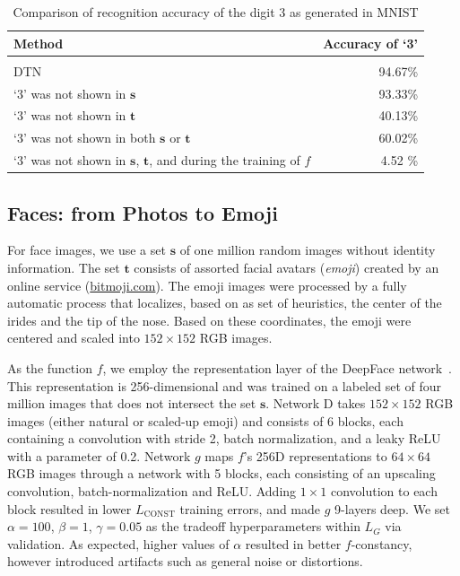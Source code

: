\documentclass{article} %
\begin{document}
\begin{table}[t]
\caption{Comparison of recognition accuracy of the digit 3 as generated in MNIST}
\label{tab:compare3}
\begin{center}
\begin{tabular}{lr}
Method & Accuracy of `3'\\ \hline \\
DTN & 94.67\%   \\
`3' was not shown in $\mathbf s$            & 93.33\%  \\
`3' was not shown in $\mathbf t$             &  40.13\% \\
`3' was not shown in both $\mathbf s$ or $\mathbf t$     & 60.02\%   \\
`3' was not shown in $\mathbf s$, $\mathbf t$, and during the training of $f$ & 4.52 \%  \\
\hline
\end{tabular}
\end{center}
\end{table}

\subsection{Faces: from Photos to Emoji}

For face images, we use a set $\mathbf s$ of one million random images without identity information. The set $\mathbf t$ consists of assorted facial avatars ({\it emoji}) created by an online service (\url{bitmoji.com}). The emoji images were processed by a fully automatic process that localizes, based on as set of heuristics, the center of the irides and the tip of the nose. Based on these coordinates, the emoji were centered and scaled into $152 \times 152$ RGB images.

As the function $f$, we employ the representation layer of the DeepFace network~\cite{deepface}. This representation is 256-dimensional and was trained on a labeled set of four million images that does not intersect the set $\mathbf s$. Network D takes $152 \times 152$ RGB images (either natural or scaled-up emoji) and consists of 6 blocks, each containing a convolution with stride 2, batch normalization, and a leaky ReLU with a parameter of 0.2. Network $g$ maps $f$'s 256D representations to $64 \times 64$ RGB images through a network with 5 blocks, each consisting of an upscaling convolution, batch-normalization and ReLU. Adding $1 \times 1$ convolution to each block resulted in lower $L_\text{CONST}$ training errors, and made $g$ 9-layers deep. We set $\alpha = 100$, $\beta = 1$, $\gamma = 0.05$ as the tradeoff hyperparameters within $L_G$ via validation. As expected, higher values of $\alpha$ resulted in better $f$-constancy, however introduced artifacts such as general noise or distortions. 
\end{document}
